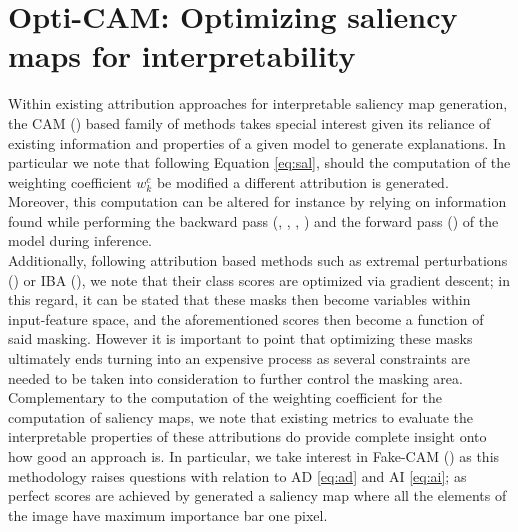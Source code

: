 \chapter{Opti-CAM: Optimizing saliency maps for interpretability}
\chaptertoc{}
\label{ch:opticam}

\noindent Within existing attribution approaches for interpretable saliency map generation, the CAM 
(\cite{zhou2016learning}) based family of methods takes special interest given its reliance of
existing  information and properties of a given model to generate explanations. In particular we 
note that following Equation \ref{eq:sal}, should the computation of the weighting coefficient 
$w_k^c$ be modified a different attribution is generated. Moreover, this computation can be altered
 for instance by relying on information found while performing the backward pass 
 (\cite{selvaraju2017grad}, \cite{chattopadhay2018grad}, \cite{axiombased}, 
 \cite{smilkov2017smoothgrad}) and the forward pass (\cite{wang2020score}) of the model during 
 inference.\\

\noindent Additionally, following attribution based methods such as extremal perturbations 
(\cite{fong2019understanding}) or IBA (\cite{schulz2020restricting}), 
we note that their class scores are optimized via gradient descent; in this regard, it can 
be stated that these masks then become variables within input-feature space, and the aforementioned 
scores then become a function of said masking. However it is important to point that optimizing 
these masks ultimately ends turning into an expensive process as several constraints are needed 
to be taken into consideration to further control the masking area.\\

\noindent Complementary to the computation of the weighting coefficient for the computation of 
saliency maps, we note that existing metrics to evaluate the interpretable properties of these 
attributions do provide complete insight onto how good an approach is. In particular, we take 
interest in Fake-CAM (\cite{poppi2021revisiting}) as this methodology raises questions with 
relation to AD \ref{eq:ad} and AI \ref{eq:ai}; as perfect scores are achieved by generated a 
saliency map where all the elements of the image have maximum importance bar one pixel.\\

